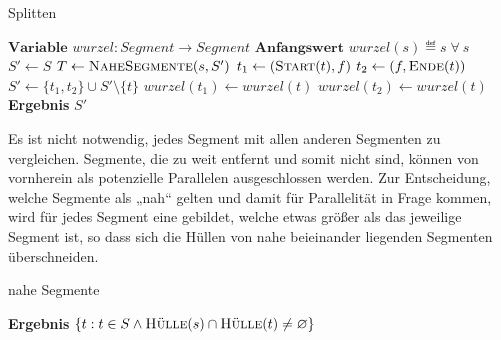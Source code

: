 \documentclass[../main/thesis.tex]{subfiles}
\begin{document}

\begin{algorithmhere}{Splitten}
\label{alg:Splitten}
\begin{algorithmic}
\State $\textbf{Variable } wurzel : Segment \rightarrow Segment$
\State $\textbf{Anfangswert } wurzel(s) \eqdef s\;\forall\ s$
	\State $S' \gets S$
			\State $T \gets \textproc{NaheSegmente}(s, S')$
				\State $t_1 \gets (\textproc{Start}(t), f)$
				\State $t_2 \gets (f, \textproc{Ende}(t))$
				\State $S' \gets \{t_1, t_2\} \cup S' \setminus \{t\}$
				\State $wurzel(t_1) \gets wurzel(t)$
				\State $wurzel(t_2) \gets wurzel(t)$
			\EndFor
		\EndFor
	\EndFor
	\State \textbf{Ergebnis} $S'$
\EndFunction
\end{algorithmic}
\end{algorithmhere}

Es ist nicht notwendig, jedes Segment mit allen anderen Segmenten zu vergleichen.
Segmente, die zu weit entfernt und somit nicht  sind, können von vornherein als potenzielle Parallelen ausgeschlossen werden.
Zur Entscheidung, welche Segmente als „nah“ gelten und damit für Parallelität in Frage kommen, wird für jedes Segment eine  gebildet, welche etwas größer als das jeweilige Segment ist, so dass sich die Hüllen von nahe beieinander liegenden Segmenten überschneiden.


\begin{algorithmhere}{nahe Segmente}
\label{alg:NaheSegmente}
\begin{algorithmic}
	\State \textbf{Ergebnis} $\{t : t \in S \wedge \textproc{Hülle}(s) \cap \textproc{Hülle}(t) \neq \varnothing\}$
\EndFunction
\end{algorithmic}
\end{algorithmhere}
\end{document}
